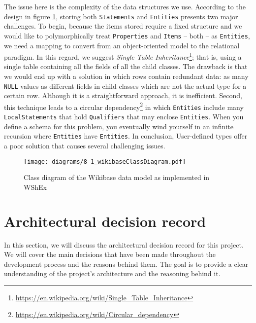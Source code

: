 \begin{code}
    \inputminted{scala}{code/listings/8-2_udtRegistration.scala}
\end{code}

The issue here is the complexity of the data structures we use. According to the design in figure \ref{fig:wikibaseClassDiagram}, storing both \texttt{Statements} and \texttt{Entities} presents two major challenges. To begin, because the items stored require a fixed structure and we would like to polymorphically treat \texttt{Properties} and \texttt{Items} -- both -- as \texttt{Entities}, we need a mapping to convert from an object-oriented model to the relational paradigm. In this regard, we suggest \textit{Single Table Inheritance}\footnote{\url{https://en.wikipedia.org/wiki/Single_Table_Inheritance}}; that is, using a single table containing all the fields of all the child classes. The drawback is that we would end up with a solution in which rows contain redundant data: as many \texttt{NULL} values as different fields in child classes which are not the actual type for a certain row. Although it is a straightforward approach, it is inefficient. Second, this technique leads to a circular dependency\footnote{\url{https://en.wikipedia.org/wiki/Circular_dependency}} in which \texttt{Entities} include many \texttt{LocalStatements} that hold \texttt{Qualifiers} that may enclose \texttt{Entities}. When you define a schema for this problem, you eventually wind yourself in an infinite recursion where \texttt{Entities} have \texttt{Entities}. In conclusion, User-defined types offer a poor solution that causes several challenging issues.

\begin{figure}[ht]
    \centering
    \texttt{[image: diagrams/8-1\_wikibaseClassDiagram.pdf]}
    \caption[Class diagram of the Wikibase data model as implemented in WShEx]{Class diagram of the Wikibase data model as implemented in WShEx\footnotemark}
    \label{fig:wikibaseClassDiagram}
\end{figure}

\section{Architectural decision record}

In this section, we will discuss the architectural decision record for this project. We will cover the main decisions that have been made throughout the development process and the reasons behind them. The goal is to provide a clear understanding of the project's architecture and the reasoning behind it.

